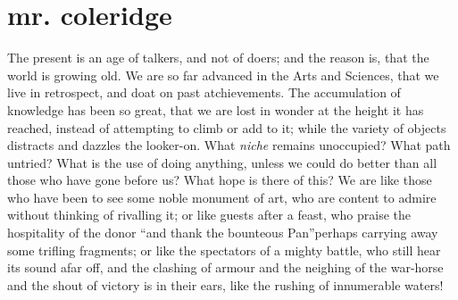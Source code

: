 \chapter[Mr. Coleridge]{mr. coleridge}

The present is an age of talkers, and not of doers; and the reason
is, that the world is growing old. We are so far advanced in the
Arts and Sciences, that we live in retrospect, and doat on past
atchievements.  The accumulation of knowledge has been so great,
that we are lost in wonder at the height it has reached, instead
of attempting to climb or add to it; while the variety of objects
distracts and dazzles the looker-on. What \emph{niche} remains
unoccupied? What path untried? What is the use of doing anything,
unless we could do better than all those who have gone before us?
What hope is there of this? We are like those who have been to see
some noble monument of art, who are content to admire without
thinking of rivalling it; or like guests after a feast, who praise
the hospitality of the donor ``and thank the bounteous
Pan''\textemdash perhaps carrying away some trifling fragments; or
like the spectators of a mighty battle, who still hear its sound
afar off, and the clashing of armour and the neighing of the
war-horse and the shout of victory is in their ears, like the
rushing of innumerable waters!

